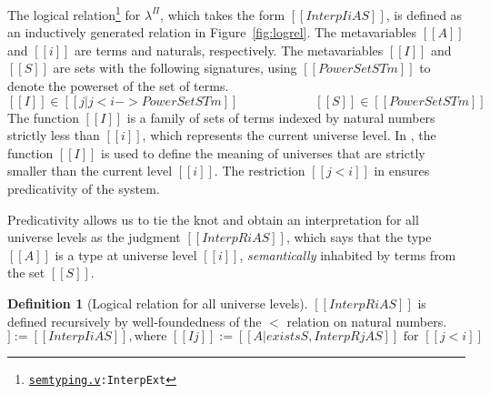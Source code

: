 \documentclass[\ifpublic nolinenum\else\fi,online,OA]{jfp}
\newcommand{\scw}[1]{}
\newcommand{\yl}[1]{}
\newcommand{\dotv}[2]{\href{#1}{\texttt{#1}}{\texttt{:#2}}}
\newcommand{\lang}{$\lambda^{\Pi}$\xspace}
\theoremstyle{definition}
\newtheorem{definition}[theorem]{Definition}
\begin{document}
The logical relation\footnote{\dotv{semtyping.v}{InterpExt}} for \lang{},
which takes the form $[[Interp I i A S]]$,
is defined as an inductively generated relation in Figure~\ref{fig:logrel}.
The metavariables $[[A]]$ and $[[i]]$ are terms and naturals, respectively.
The metavariables $[[I]]$ and $[[S]]$ are
sets with the following signatures,
using $[[PowerSet STm]]$ to denote the powerset of the set of terms.
\[
    [[I]] \in [[ { j | j < i  } ->  PowerSet STm ]] \qquad\qquad\qquad
    [[S]] \in [[PowerSet STm]]
\]
The function $[[I]]$ is a family of sets of terms indexed by natural numbers
strictly less than $[[i]]$, which represents the current universe level.
In , the function $[[I]]$ is used to define the meaning of
universes that are strictly smaller than the current level $[[i]]$. The
restriction $[[j < i]]$ in  ensures predicativity of the system.

Predicativity allows us to tie the knot and obtain an interpretation for all
universe levels as the judgment $[[InterpR i A S]]$, which says that the type
$[[A]]$ is a type at universe level $[[i]]$, \emph{semantically} inhabited by
terms from the set $[[S]]$.

\begin{definition}[Logical relation for all universe levels]
\label{fig:logrelrec}
$[[InterpR i A S]]$ is defined recursively by well-foundedness of the $<$
relation on natural numbers.
\begin{equation*}
    [[InterpR i A S]] := [[ Interp I i A S  ]], \text{where } [[I j]]
    := [[{A | exists S , InterpR j A S}]] \text{ for } [[j < i]]
\end{equation*}
\end{definition}
\end{document}
